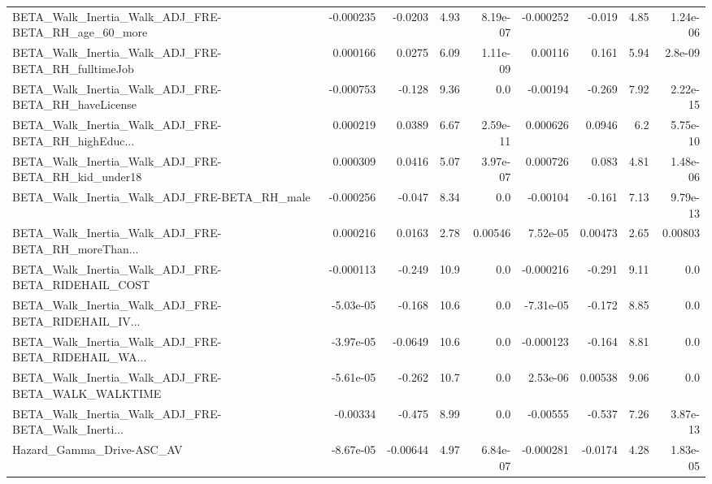 \begin{tabular}{lrrrrrrrr}
BETA\_Walk\_Inertia\_Walk\_ADJ\_FRE-BETA\_RH\_age\_60\_more &   -0.000235 &      -0.0203 &     4.93 & 8.19e-07 &  -0.000252 &      -0.019 &         4.85 &      1.24e-06 \\
BETA\_Walk\_Inertia\_Walk\_ADJ\_FRE-BETA\_RH\_fulltimeJob &    0.000166 &       0.0275 &     6.09 & 1.11e-09 &    0.00116 &       0.161 &         5.94 &       2.8e-09 \\
BETA\_Walk\_Inertia\_Walk\_ADJ\_FRE-BETA\_RH\_haveLicense &   -0.000753 &       -0.128 &     9.36 &      0.0 &   -0.00194 &      -0.269 &         7.92 &      2.22e-15 \\
BETA\_Walk\_Inertia\_Walk\_ADJ\_FRE-BETA\_RH\_highEduc... &    0.000219 &       0.0389 &     6.67 & 2.59e-11 &   0.000626 &      0.0946 &          6.2 &      5.75e-10 \\
BETA\_Walk\_Inertia\_Walk\_ADJ\_FRE-BETA\_RH\_kid\_under18 &    0.000309 &       0.0416 &     5.07 & 3.97e-07 &   0.000726 &       0.083 &         4.81 &      1.48e-06 \\
BETA\_Walk\_Inertia\_Walk\_ADJ\_FRE-BETA\_RH\_male        &   -0.000256 &       -0.047 &     8.34 &      0.0 &   -0.00104 &      -0.161 &         7.13 &      9.79e-13 \\
BETA\_Walk\_Inertia\_Walk\_ADJ\_FRE-BETA\_RH\_moreThan... &    0.000216 &       0.0163 &     2.78 &  0.00546 &   7.52e-05 &     0.00473 &         2.65 &       0.00803 \\
BETA\_Walk\_Inertia\_Walk\_ADJ\_FRE-BETA\_RIDEHAIL\_COST  &   -0.000113 &       -0.249 &     10.9 &      0.0 &  -0.000216 &      -0.291 &         9.11 &           0.0 \\
BETA\_Walk\_Inertia\_Walk\_ADJ\_FRE-BETA\_RIDEHAIL\_IV... &   -5.03e-05 &       -0.168 &     10.6 &      0.0 &  -7.31e-05 &      -0.172 &         8.85 &           0.0 \\
BETA\_Walk\_Inertia\_Walk\_ADJ\_FRE-BETA\_RIDEHAIL\_WA... &   -3.97e-05 &      -0.0649 &     10.6 &      0.0 &  -0.000123 &      -0.164 &         8.81 &           0.0 \\
BETA\_Walk\_Inertia\_Walk\_ADJ\_FRE-BETA\_WALK\_WALKTIME  &   -5.61e-05 &       -0.262 &     10.7 &      0.0 &   2.53e-06 &     0.00538 &         9.06 &           0.0 \\
BETA\_Walk\_Inertia\_Walk\_ADJ\_FRE-BETA\_Walk\_Inerti... &    -0.00334 &       -0.475 &     8.99 &      0.0 &   -0.00555 &      -0.537 &         7.26 &      3.87e-13 \\
Hazard\_Gamma\_Drive-ASC\_AV                          &   -8.67e-05 &     -0.00644 &     4.97 & 6.84e-07 &  -0.000281 &     -0.0174 &         4.28 &      1.83e-05 \\

\end{tabular}
